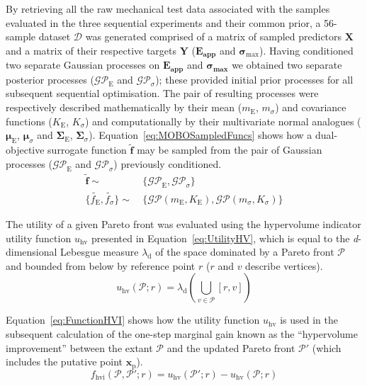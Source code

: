 By retrieving all the raw mechanical test data associated with the samples
 evaluated in the three sequential experiments and their common prior, a
 56-sample dataset \(\mathcal{D}\) was generated comprised of a matrix of
 sampled predictors \(\mathbf{X}\) and a matrix of their respective
 targets \(\mathbf{Y}\) (\(\mathbf{E_{\text{app}}}\) and \(\bm{\sigma_{\mathrm{max}}}\)).
Having conditioned two separate Gaussian processes on \(\mathbf{E_{\text{app}}}\) and
 \(\bm{\sigma_{\text{max}}}\) we obtained two separate posterior processes
 (\(\mathcal{GP}_{\mathrm{E}}\) and \(\mathcal{GP}_{\sigma}\)); these
 provided initial prior processes for all subsequent sequential optimisation.
The pair of resulting processes were respectively described mathematically
 by their mean (\(m_{\mathrm{E}}\), \(m_{\sigma}\)) and covariance functions
 (\(K_{\mathrm{E}}\), \(K_{\sigma}\)) and computationally by their multivariate
 normal analogues (\(\bm{\mu}_{\mathrm{E}}\), \(\bm{\mu}_{\sigma}\) and
 \(\bm{\Sigma}_{\mathrm{E}}\), \(\bm{\Sigma}_{\sigma}\)).
Equation~\ref{eq:MOBOSampledFuncs} shows how a dual-objective surrogate
 function \(\tilde{\mathbf{f}}\) may be sampled from the pair of Gaussian
 processes (\(\mathcal{GP}_{\mathrm{E}}\) and \(\mathcal{GP}_{\sigma}\)) previously
 conditioned.
\footnotesize
\begin{equation}\label{eq:MOBOSampledFuncs}
    \begin{split}
    \tilde{\mathbf{f}}\sim\:&\{\mathcal{GP}_{\mathrm{E}},\mathcal{GP}_{\sigma}\}\\
    \{\tilde{f_{\mathrm{E}}},\tilde{f_{\sigma}}\}\sim\:&\{\mathcal{GP}(m_{\mathrm{E}},K_{\mathrm{E}}),\mathcal{GP}(m_{\sigma},K_{\sigma})\}
    \end{split}
\end{equation}
\normalsize

The utility of a given Pareto front was evaluated using the hypervolume indicator
 utility function \(u_{\mathrm{hv}}\) presented in Equation~\ref{eq:UtilityHV}, which
 is equal to the \textit{d}-dimensional Lebesgue measure \(\lambda_{\mathrm{d}}\) of the space
 dominated by a Pareto front \(\mathcal{P}\) and bounded from below by
 reference point \(r\) (\(r\) and \(v\) describe vertices).
\begin{equation}\label{eq:UtilityHV}
    u_{\mathrm{hv}}(\mathcal{P};r)=\lambda_{\mathrm{d}}(\bigcup_{v \in \mathcal{P}}[r,v])
\end{equation}

Equation~\ref{eq:FunctionHVI} shows how the utility function \(u_{\mathrm{hv}}\) is
 used in the subsequent calculation of the one-step marginal gain known as
 the ``hypervolume improvement'' between the extant \(\mathcal{P}\) and the
 updated Pareto front \(\mathcal{P}'\) (which includes the putative point
 \(\mathbf{x}_{\mathrm{p}}\)).
\begin{equation}\label{eq:FunctionHVI}
    f_{\mathrm{hvi}}(\mathcal{P},\mathcal{P}';r)=u_{\mathrm{hv}}(\mathcal{P}';r)-u_{\mathrm{hv}}(\mathcal{P};r)
\end{equation}

